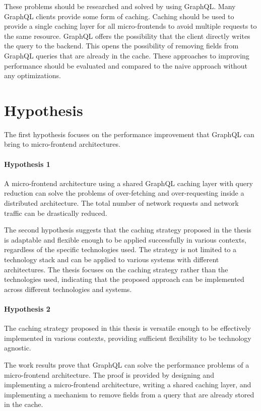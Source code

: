 \bigskip

\noindent These problems should be researched and solved by using GraphQL. Many GraphQL clients provide some form of caching. Caching should be used to provide a single caching layer for all micro-frontends to avoid multiple requests to the same resource. GraphQL offers the possibility that the client directly writes the query to the backend. This opens the possibility of removing fields from GraphQL queries that are already in the cache. These approaches to improving performance should be evaluated and compared to the naive approach without any optimizations.

\section{Hypothesis}\label{section:introduction:hypothesis}

The first hypothesis focuses on the performance improvement that GraphQL can bring to micro-frontend architectures.

\paragraph{Hypothesis 1} 
A micro-frontend architecture using a shared GraphQL caching layer with query reduction can solve the problems of over-fetching and over-requesting inside a distributed architecture. The total number of network requests and network traffic can be drastically reduced.

\bigskip

\noindent The second hypothesis suggests that the caching strategy proposed in the thesis is adaptable and flexible enough to be applied successfully in various contexts, regardless of the specific technologies used. The strategy is not limited to a technology stack and can be applied to various systems with different architectures. The thesis focuses on the caching strategy rather than the technologies used, indicating that the proposed approach can be implemented across different technologies and systems.

\paragraph{Hypothesis 2}
The caching strategy proposed in this thesis is versatile enough to be effectively implemented in various contexts, providing sufficient flexibility to be technology agnostic.

\bigskip

\noindent The work results prove that GraphQL can solve the performance problems of a micro-frontend architecture. The proof is provided by designing and implementing a micro-frontend architecture, writing a shared caching layer, and implementing a mechanism to remove fields from a query that are already stored in the cache.
